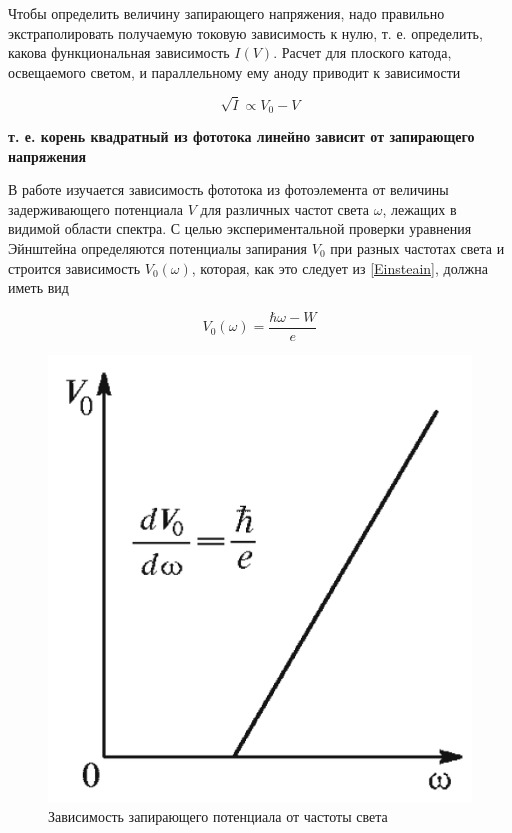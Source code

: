 \documentclass[a4paper,12pt]{article}
\begin{document}
Чтобы определить величину запирающего напряжения, надо правильно экстраполировать получаемую токовую зависимость к нулю, т. е. определить, какова функциональная зависимость $ I(V) $. Расчет для плоского катода, освещаемого светом, и параллельному ему аноду приводит к зависимости
	
\begin{equation}
\sqrt{I} \propto V_0 - V
\label{e:i_root}
\end{equation}
	
\textbf{т. е. корень квадратный из фототока линейно зависит от запирающего напряжения}

	В работе изучается зависимость фототока из фотоэлемента от величины задерживающего потенциала $ V $ для различных частот света $ \omega $, лежащих в видимой области спектра. С целью экспериментальной проверки уравнения Эйнштейна определяются потенциалы запирания $ V_0 $ при разных частотах света и строится зависимость $ V_0(\omega) $, которая, как это следует из \eqref{Einsteain}, должна иметь вид
	
\begin{equation}
V_0 (\omega) = \dfrac{\hbar\omega - W}{e}
\label{e:v_zero}
\end{equation}
	
\begin{figure}[h!]
\centering
\includegraphics[scale=0.3]{V(w)}
\caption{Зависимость запирающего потенциала
от частоты света}
\label{fig:v_zero}
\end{figure}
	
\end{document}
